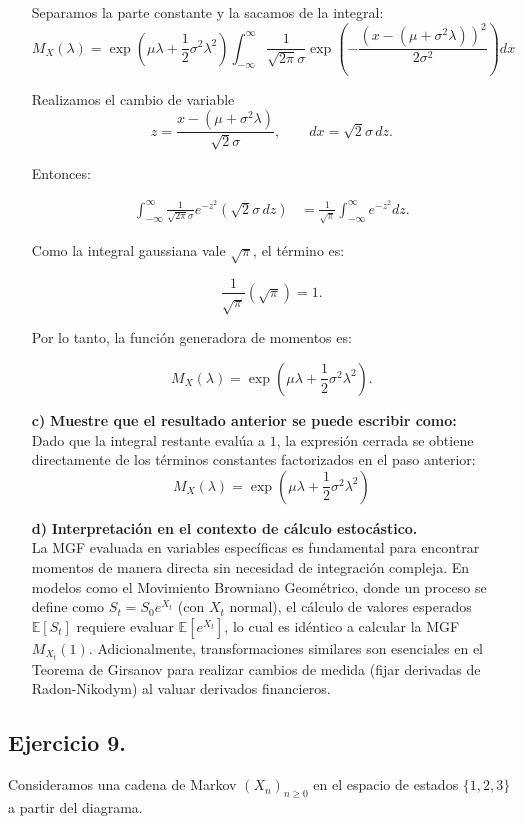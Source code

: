 \documentclass[10pt,a4paper]{book}
\begin{document}
\begin{itemize}
  Separamos la parte constante y la sacamos de la integral:
\[
M_X(\lambda) =
\exp\left(\mu\lambda + \frac{1}{2}\sigma^2\lambda^2\right)
\int_{-\infty}^{\infty}
\frac{1}{\sqrt{2\pi}\sigma}
\exp\left(
-\frac{\left(x-(\mu+\sigma^2\lambda)\right)^2}{2\sigma^2}
\right) dx
\]

Realizamos el cambio de variable
\[
z = \frac{x-(\mu+\sigma^2\lambda)}{\sqrt{2}\sigma},
\qquad
dx = \sqrt{2}\sigma\,dz.
\]

Entonces:

\begin{align*}
\int_{-\infty}^{\infty}
\frac{1}{\sqrt{2\pi}\sigma}
e^{-z^2}(\sqrt{2}\sigma\,dz)
&=
\frac{1}{\sqrt{\pi}}
\int_{-\infty}^{\infty} e^{-z^2} dz.
\end{align*}

Como la integral gaussiana vale $\sqrt{\pi}$, el término es:

\[
\frac{1}{\sqrt{\pi}}(\sqrt{\pi})=1.
\]

Por lo tanto, la función generadora de momentos es:

\[
M_X(\lambda)=
\exp\left(\mu\lambda+\frac{1}{2}\sigma^2\lambda^2\right).
\]

    \item[\textbf{c)}] \textbf{Muestre que el resultado anterior se puede escribir como:} \\
    Dado que la integral restante evalúa a $1$, la expresión cerrada se obtiene directamente de los términos constantes factorizados en el paso anterior:
    \[ M_X(\lambda) = \exp\left(\mu\lambda + \frac{1}{2}\sigma^2\lambda^2\right) \]

    \item[\textbf{d)}] \textbf{Interpretación en el contexto de cálculo estocástico.} \\
    La MGF evaluada en variables específicas es fundamental para encontrar momentos de manera directa sin necesidad de integración compleja. En modelos como el Movimiento Browniano Geométrico, donde un proceso se define como $S_t = S_0 e^{X_t}$ (con $X_t$ normal), el cálculo de valores esperados $\mathbb{E}[S_t]$ requiere evaluar $\mathbb{E}[e^{X_t}]$, lo cual es idéntico a calcular la MGF $M_{X_t}(1)$. Adicionalmente, transformaciones similares son esenciales en el Teorema de Girsanov para realizar cambios de medida (fijar derivadas de Radon-Nikodym) al valuar derivados financieros.
\end{itemize}

\newpage

\subsection{Ejercicio 9.} Consideramos una cadena de Markov 
\((X_n)_{n\ge 0}\) en el espacio de estados \(\{1,2,3\}\) a partir del diagrama.
\end{document}
